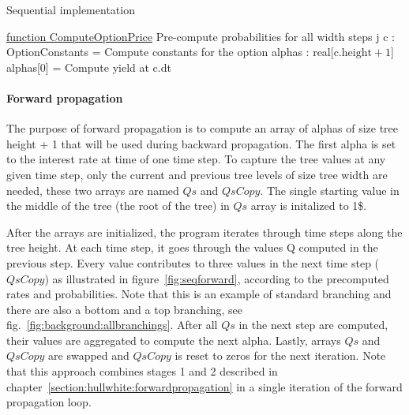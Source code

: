 \begin{algorithm}[H]
    \DontPrintSemicolon
    \caption{Sequential implementation\label{alg:sequential}}

    \underline{function ComputeOptionPrice}\;
    \;
    Pre-compute probabilities for all width steps j\;
    c : OptionConstants = Compute constants for the option\;
    \;
    alphas : real[$\text{c.height} + 1$]\;
    alphas[0] = Compute yield at c.dt\;
\end{algorithm}

\pagebreak
\paragraph{Forward propagation}
The purpose of forward propagation is to compute an array of alphas of size tree height + 1 that will be used during backward propagation. The first alpha is set to the interest rate at time of one time step. To capture the tree values at any given time step, only the current and previous tree levels of size tree width are needed, these two arrays are named $\mathit{Qs}$ and $\mathit{QsCopy}$. The single starting value in the middle of the tree (the root of the tree) in $\mathit{Qs}$ array is initalized to 1\$.

After the arrays are initialized, the program iterates through time steps along the tree height. At each time step, it goes through the values Q computed in the previous step. Every value contributes to three values in the next time step ($\mathit{QsCopy}$) as illustrated in figure~\ref{fig:seqforward}, according to the precomputed rates and probabilities. Note that this is an example of standard branching and there are also a bottom and a top branching, see fig.~\ref{fig:background:allbranchings}. After all $\mathit{Qs}$ in the next step are computed, their values are aggregated to compute the next alpha. Lastly, arrays $\mathit{Qs}$ and $\mathit{QsCopy}$ are swapped and $\mathit{QsCopy}$ is reset to zeros for the next iteration. Note that this approach combines stages 1 and 2 described in chapter~\ref{section:hullwhite:forwardpropagation} in a single iteration of the forward propagation loop. 

